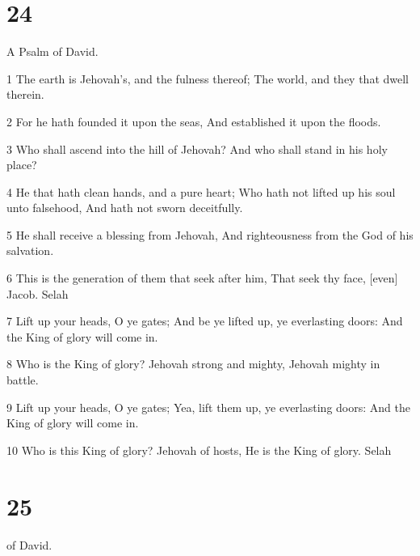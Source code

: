 \chapter{24}

\par A Psalm of David.

\par 1 The earth is Jehovah's, and the fulness thereof; The world, and they that dwell therein.
\par 2 For he hath founded it upon the seas, And established it upon the floods.
\par 3 Who shall ascend into the hill of Jehovah? And who shall stand in his holy place?
\par 4 He that hath clean hands, and a pure heart; Who hath not lifted up his soul unto falsehood, And hath not sworn deceitfully.
\par 5 He shall receive a blessing from Jehovah, And righteousness from the God of his salvation.
\par 6 This is the generation of them that seek after him, That seek thy face, [even] Jacob. Selah
\par 7 Lift up your heads, O ye gates; And be ye lifted up, ye everlasting doors: And the King of glory will come in.
\par 8 Who is the King of glory? Jehovah strong and mighty, Jehovah mighty in battle.
\par 9 Lift up your heads, O ye gates; Yea, lift them up, ye everlasting doors: And the King of glory will come in.
\par 10 Who is this King of glory? Jehovah of hosts, He is the King of glory. Selah

\chapter{25}

\par [A Psalm] of David.

